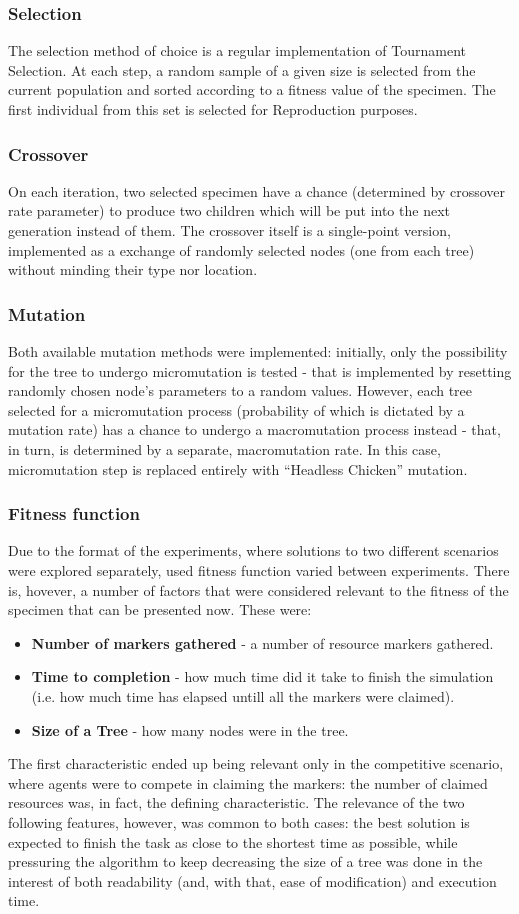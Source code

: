\subsubsection{Selection}
The selection method of choice is a regular implementation of Tournament Selection. At each step, a random sample of a given size is selected from the current population and sorted according to a fitness value of the specimen. The first individual from this set is selected for Reproduction purposes.
\subsubsection{Crossover}
On each iteration, two selected specimen have a chance (determined by crossover rate parameter) to produce two children which will be put into the next generation instead of them. The crossover itself is a single-point version, implemented as a exchange of randomly selected nodes (one from each tree) without minding their type nor location.
\subsubsection{Mutation}
Both available mutation methods were implemented: initially, only the possibility for the tree to undergo micromutation is tested - that is implemented by resetting randomly chosen node's parameters to a random values. However, each tree selected for a micromutation process (probability of which is dictated by a mutation rate) has a chance to undergo a macromutation process instead - that, in turn, is determined by a separate, macromutation rate. In this case, micromutation step is replaced entirely with ``Headless Chicken'' mutation.
\subsubsection{Fitness function}
Due to the format of the experiments, where solutions to two different scenarios were explored separately, used fitness function varied between experiments. There is, hovever, a number of factors that were considered relevant to the fitness of the specimen that can be presented now. These were:
\begin{itemize}
    \item \textbf{Number of markers gathered} - a number of resource markers gathered.
    \item \textbf{Time to completion} - how much time did it take to finish the simulation (i.e. how much time has elapsed untill all the markers were claimed).
    \item \textbf{Size of a Tree} - how many nodes were in the tree.
\end{itemize}
The first characteristic ended up being relevant only in the competitive scenario, where agents were to compete in claiming the markers: the number of claimed resources was, in fact, the defining characteristic. The relevance of the two following features, however, was common to both cases: the best solution is expected to finish the task as close to the shortest time as possible, while pressuring the algorithm to keep decreasing the size of a tree was done in the interest of both readability (and, with that, ease of modification) and execution time.
